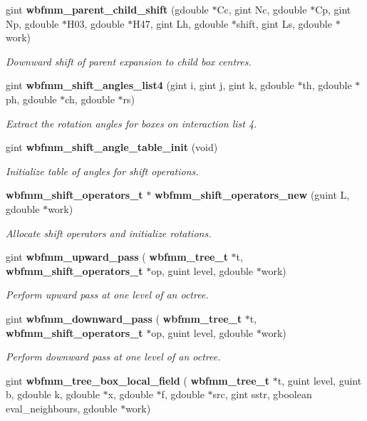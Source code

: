 \begin{DoxyCompactItemize}
gint \textbf{ wbfmm\+\_\+parent\+\_\+child\+\_\+shift} (gdouble $\ast$Cc, gint Nc, gdouble $\ast$Cp, gint Np, gdouble $\ast$H03, gdouble $\ast$H47, gint Lh, gdouble $\ast$shift, gint Ls, gdouble $\ast$work)
\begin{DoxyCompactList}\small\item\em Downward shift of parent expansion to child box centres. \end{DoxyCompactList}\item 
gint \textbf{ wbfmm\+\_\+shift\+\_\+angles\+\_\+list4} (gint i, gint j, gint k, gdouble $\ast$th, gdouble $\ast$ph, gdouble $\ast$ch, gdouble $\ast$rs)
\begin{DoxyCompactList}\small\item\em Extract the rotation angles for boxes on interaction list 4. \end{DoxyCompactList}\item 
gint \textbf{ wbfmm\+\_\+shift\+\_\+angle\+\_\+table\+\_\+init} (void)
\begin{DoxyCompactList}\small\item\em Initialize table of angles for shift operations. \end{DoxyCompactList}\item 
\textbf{ wbfmm\+\_\+shift\+\_\+operators\+\_\+t} $\ast$ \textbf{ wbfmm\+\_\+shift\+\_\+operators\+\_\+new} (guint L, gdouble $\ast$work)
\begin{DoxyCompactList}\small\item\em Allocate shift operators and initialize rotations. \end{DoxyCompactList}\item 
gint \textbf{ wbfmm\+\_\+upward\+\_\+pass} (\textbf{ wbfmm\+\_\+tree\+\_\+t} $\ast$t, \textbf{ wbfmm\+\_\+shift\+\_\+operators\+\_\+t} $\ast$op, guint level, gdouble $\ast$work)
\begin{DoxyCompactList}\small\item\em Perform upward pass at one level of an octree. \end{DoxyCompactList}\item 
gint \textbf{ wbfmm\+\_\+downward\+\_\+pass} (\textbf{ wbfmm\+\_\+tree\+\_\+t} $\ast$t, \textbf{ wbfmm\+\_\+shift\+\_\+operators\+\_\+t} $\ast$op, guint level, gdouble $\ast$work)
\begin{DoxyCompactList}\small\item\em Perform downward pass at one level of an octree. \end{DoxyCompactList}\item 
gint \textbf{ wbfmm\+\_\+tree\+\_\+box\+\_\+local\+\_\+field} (\textbf{ wbfmm\+\_\+tree\+\_\+t} $\ast$t, guint level, guint b, gdouble k, gdouble $\ast$x, gdouble $\ast$f, gdouble $\ast$src, gint sstr, gboolean eval\+\_\+neighbours, gdouble $\ast$work)

\end{DoxyCompactItemize}
